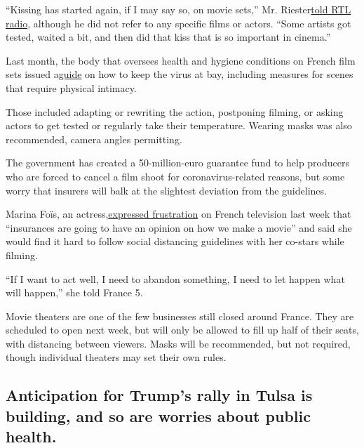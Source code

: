 ``Kissing has started again, if I may say so, on movie sets,'' Mr.
Riester\href{https://www.youtube.com/watch?v=4dX3iuNs1u8}{told RTL
radio}, although he did not refer to any specific films or actors.
``Some artists got tested, waited a bit, and then did that kiss that is
so important in cinema.''

Last month, the body that oversees health and hygiene conditions on
French film sets issued
a\href{http://www.cchscinema.org/covid-19-guide-des-preconisations-de-securite-sanitaire-pour-les-activites-de-la-production-audiovisuelle-cinematographique-et-publicitaire/\#}{guide}
on how to keep the virus at bay, including measures for scenes that
require physical intimacy.

Those included adapting or rewriting the action, postponing filming, or
asking actors to get tested or regularly take their temperature. Wearing
masks was also recommended, camera angles permitting.

The government has created a 50-million-euro guarantee fund to help
producers who are forced to cancel a film shoot for coronavirus-related
reasons, but some worry that insurers will balk at the slightest
deviation from the guidelines.

Marina Foïs, an
actress,\href{https://www.voici.fr/news-people/actu-people/marina-fois-pourquoi-elle-trouve-ridicule-les-nouvelles-mesures-imposees-sur-les-tournages-682223}{expressed
frustration} on French television last week that ``insurances are going
to have an opinion on how we make a movie'' and said she would find it
hard to follow social distancing guidelines with her co-stars while
filming.

``If I want to act well, I need to abandon something, I need to let
happen what will happen,'' she told France 5.

Movie theaters are one of the few businesses still closed around France.
They are scheduled to open next week, but will only be allowed to fill
up half of their seats, with distancing between viewers. Masks will be
recommended, but not required, though individual theaters may set their
own rules.

\hypertarget{anticipation-for-trumps-rally-in-tulsa-is-building-and-so-are-worries-about-public-health}{%
\subsection{Anticipation for Trump's rally in Tulsa is building, and so
are worries about public
health.}\label{anticipation-for-trumps-rally-in-tulsa-is-building-and-so-are-worries-about-public-health}}

